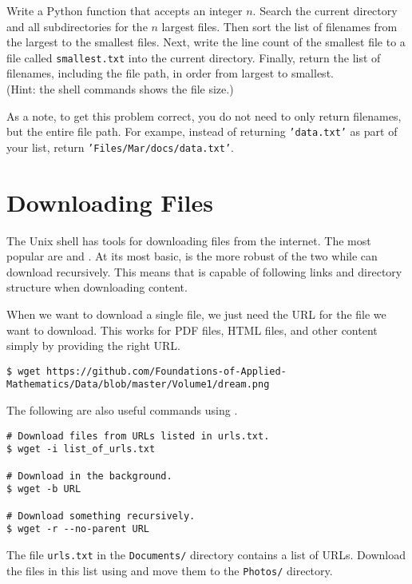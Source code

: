 \begin{problem}
Write a Python function that accepts an integer $n$.
Search the current directory and all subdirectories for the $n$ largest files.
Then sort the list of filenames from the largest to the smallest files.
Next, write the line count of the smallest file to a file called \texttt{smallest.txt} into the current directory.
Finally, return the list of filenames, including the file path, in order from largest to smallest.
\\(Hint: the shell commands  shows the file size.)

As a note, to get this problem correct, you do not need to only return filenames, but the entire file path. 
For exampe, instead of returning \texttt{'data.txt'} as part of your list, return \texttt{'Files/Mar/docs/data.txt'}.
\end{problem}

\section*{Downloading Files} %

The Unix shell has tools for downloading files from the internet.
The most popular are  and .
At its most basic,  is the more robust of the two while  can download recursively. 
This means that  is capable of following links and directory structure when downloading content.


When we want to download a single file, we just need the URL for the file we want to download.
This works for PDF files, HTML files, and other content simply by providing the right URL.

\begin{lstlisting}
$ wget https://github.com/Foundations-of-Applied-Mathematics/Data/blob/master/Volume1/dream.png
\end{lstlisting}

The following are also useful commands using .

\begin{lstlisting}
# Download files from URLs listed in urls.txt.
$ wget -i list_of_urls.txt

# Download in the background.
$ wget -b URL

# Download something recursively.
$ wget -r --no-parent URL
\end{lstlisting}

\begin{problem}
The file \texttt{urls.txt} in the \texttt{Documents/} directory contains a list of URLs.
Download the files in this list using  and move them to the \texttt{Photos/} directory.
\end{problem}

